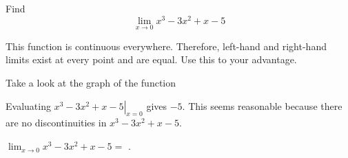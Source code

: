 \documentclass{ximera}
\begin{document}
\begin{question}
  Find 
  \[
  \displaystyle \lim_{x\to 0} x^3-3x^2+x-5
  \]
  \begin{solution}
    \begin{hint}
      This function is continuous everywhere. Therefore, left-hand and right-hand limits exist at every point and are equal. Use this to your advantage.
    \end{hint}
     \begin{hint}
    Take a look at the graph of the function
    \begin{center}
      \end{center}
    \end{hint}
    \begin{hint}
     Evaluating $\left.x^3-3x^2+x-5\right|_{x=0}$ gives $-5$. This seems reasonable because there are no discontinuities in $x^3-3x^2+x-5$.
    \end{hint}
    $\displaystyle{\lim_{x\to0}x^3-3x^2+x-5}=$
    .
  \end{solution}
\end{question}
\end{document}

